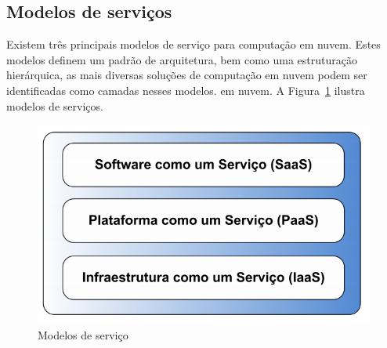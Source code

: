 \documentclass[twoside,english,brazilian]{UNISINOSartigo}
\begin{document}
\subsection{Modelos de serviços}
Existem três principais modelos de serviço para computação em nuvem. Estes modelos definem um padrão de arquitetura, bem como uma estruturação hierárquica, as mais diversas soluções de computação em nuvem podem ser identificadas como camadas nesses modelos. 
em nuvem. A Figura~\ref{fig:saas_paas} ilustra modelos de serviços.

\begin{figure}
	\caption{Modelos de serviço}
	\label{fig:saas_paas}
	\centering%
	\begin{minipage}{.4\textwidth}
		\includegraphics[width=\textwidth]{saas_paas}
	\end{minipage}
\end{figure}
\end{document}
